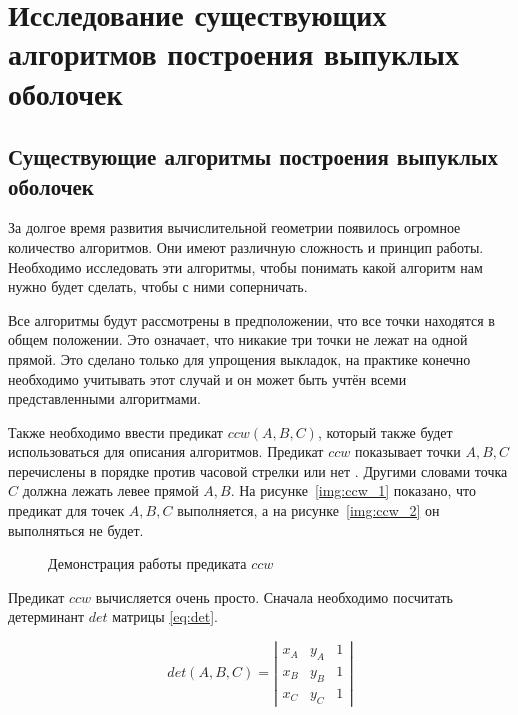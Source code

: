 \chapter{Исследование существующих алгоритмов построения выпуклых оболочек} \label{chapt1}

\section{Существующие алгоритмы построения выпуклых оболочек} \label{sect1_1}

За долгое время развития вычислительной геометрии появилось огромное количество алгоритмов. Они имеют различную сложность и принцип работы. Необходимо исследовать эти алгоритмы, чтобы понимать какой алгоритм нам нужно будет сделать, чтобы с ними соперничать.

Все алгоритмы будут рассмотрены в предположении, что все точки находятся в общем положении. Это означает, что никакие три точки не лежат на одной прямой. Это сделано только для упрощения выкладок, на практике конечно необходимо учитывать этот случай и он может быть учтён всеми представленными алгоритмами.

Также необходимо ввести предикат $ccw(A, B, C)$, который также будет использоваться для описания алгоритмов. Предикат $ccw$ показывает точки $A, B, C$ перечислены в порядке против часовой стрелки или нет \cite{pichardie2001formalizing}. Другими словами точка $C$ должна лежать левее прямой $A, B$. На рисунке~\ref{img:ccw_1} показано, что предикат для точек $A, B, C$ выполняется, а на рисунке~\ref{img:ccw_2} он выполняться не будет.

\begin{figure}[H]
	{\centering
		\hfill
		\subbottom[\label{img:ccw_1}]{%
			}
		\hfill
		\subbottom[\label{img:ccw_2}]{%
			}
		\hfill
	}
	\caption{Демонстрация работы предиката $ccw$}
	\label{img:ccw}
\end{figure}

Предикат $ccw$ вычисляется очень просто. Сначала необходимо посчитать детерминант $det$ матрицы \eqref{eq:det}.

\begin{equation}\label{eq:det}
det(A, B, C)= \left| \begin{array}{ccc} x_A & y_A & 1 \\ x_B & y_B & 1 \\ x_C & y_C & 1  \end{array}\right|
\end{equation}

